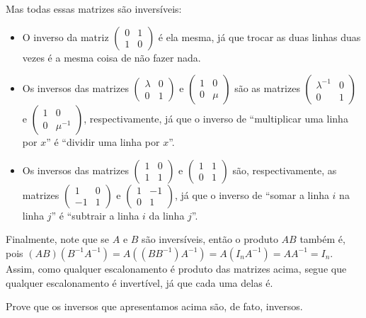 \begin{ex}
	Mas todas essas matrizes são inversíveis: 
	\begin{itemize}
		\item O inverso da matriz $\begin{pmatrix}
		0&1\\1&0
		\end{pmatrix}$ é ela mesma, já que trocar as duas linhas duas vezes é a mesma coisa de não fazer nada.
		\item Os inversos das matrizes $\begin{pmatrix}
		\lambda &0\\0&1
		\end{pmatrix}$ e $\begin{pmatrix}
		1&0\\0&\mu
		\end{pmatrix}$ são as matrizes $\begin{pmatrix}
		\lambda^{-1}&0\\0&1
		\end{pmatrix}$ e $\begin{pmatrix}
		1&0\\0&\mu^{-1}
		\end{pmatrix}$, respectivamente, já que o inverso de ``multiplicar uma linha por $x$'' é ``dividir uma linha por $x$''.
		\item Os inversos das matrizes $\begin{pmatrix}
		1&0\\1&1
		\end{pmatrix}$ e $\begin{pmatrix}
		1&1\\0&1
		\end{pmatrix}$ são, respectivamente, as matrizes $\begin{pmatrix}
		1&0\\-1&1
		\end{pmatrix}$ e $\begin{pmatrix}
		1&-1\\0&1
		\end{pmatrix}$, já que o inverso de ``somar a linha $i$ na linha $j$'' é ``subtrair a linha $i$ da linha $j$''.
	\end{itemize}

	Finalmente, note que se $A$ e $B$ são inversíveis, então o produto $AB$ também é, pois $(AB)(B^{-1}A^{-1})=A((BB^{-1})A^{-1})=A(I_nA^{-1})=AA^{-1}=I_n$. Assim, como qualquer escalonamento é produto das matrizes acima, segue que qualquer escalonamento é invertível, já que cada uma delas é.
\end{ex}

\begin{exerc}
	Prove que os inversos que apresentamos acima são, de fato, inversos.
\end{exerc}